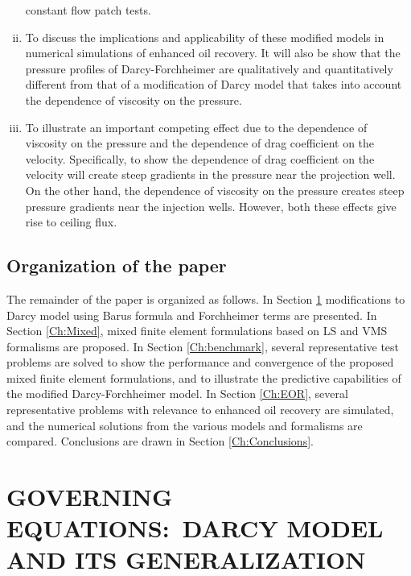 \documentclass[11pt,reqno]{amsart}
\begin{document}
\begin{enumerate}[(i)]
  constant flow patch tests.
\item To discuss the implications and applicability of 
  these modified models in numerical simulations of 
  enhanced oil recovery. It will also be show that 
  the pressure profiles of Darcy-Forchheimer are 
  qualitatively and quantitatively different from 
  that of a modification of Darcy model that takes 
  into account the dependence of viscosity on the 
  pressure. 
\item To illustrate an important competing effect 
  due to the dependence of viscosity on the pressure 
  and the dependence of drag coefficient on the 
  velocity. Specifically, to show the dependence 
  of drag coefficient on the velocity will create 
  steep gradients in the pressure near the projection 
  well. On the other hand, the dependence of viscosity 
  on the pressure creates steep pressure gradients 
  near the injection wells. However, both these 
  effects give rise to ceiling flux. 
\end{enumerate}

\subsection{Organization of the paper}
The remainder of the paper is organized as follows. 
In Section \ref{Ch:Governing} modifications to Darcy 
model using Barus formula and Forchheimer terms are 
presented. In Section \ref{Ch:Mixed}, mixed finite 
element formulations based on LS and VMS formalisms 
are proposed.
In Section \ref{Ch:benchmark}, several representative 
test problems are solved to show the performance and 
convergence of the proposed mixed finite element 
formulations, and  to illustrate the predictive 
capabilities of the modified Darcy-Forchheimer 
model. In Section \ref{Ch:EOR}, several representative 
problems with relevance to enhanced oil recovery 
are simulated, and the numerical solutions from 
the various models and formalisms are compared. 
Conclusions are drawn in Section \ref{Ch:Conclusions}.
 
\section{GOVERNING EQUATIONS:~DARCY MODEL AND ITS GENERALIZATION}
\label{Ch:Governing}
\end{document}
